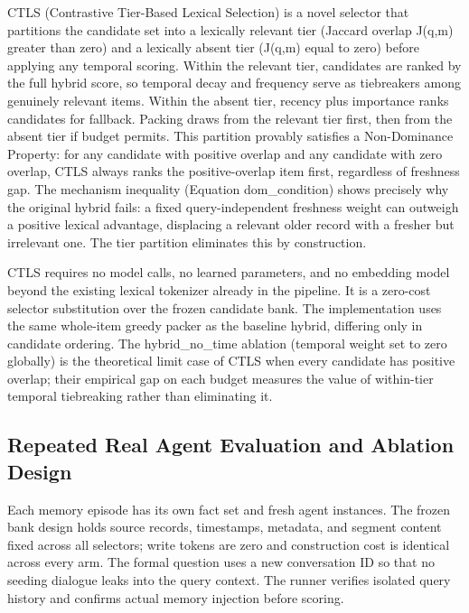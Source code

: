 \label{sec:method_ctls}

CTLS (Contrastive Tier-Based Lexical Selection) is a novel selector that partitions the candidate set into a lexically relevant tier (Jaccard overlap J(q,m) greater than zero) and a lexically absent tier (J(q,m) equal to zero) before applying any temporal scoring. Within the relevant tier, candidates are ranked by the full hybrid score, so temporal decay and frequency serve as tiebreakers among genuinely relevant items. Within the absent tier, recency plus importance ranks candidates for fallback. Packing draws from the relevant tier first, then from the absent tier if budget permits. This partition provably satisfies a Non-Dominance Property: for any candidate with positive overlap and any candidate with zero overlap, CTLS always ranks the positive-overlap item first, regardless of freshness gap. The mechanism inequality (Equation dom\_condition) shows precisely why the original hybrid fails: a fixed query-independent freshness weight can outweigh a positive lexical advantage, displacing a relevant older record with a fresher but irrelevant one. The tier partition eliminates this by construction. \citep{ref_959d6858d034c6e1}

CTLS requires no model calls, no learned parameters, and no embedding model beyond the existing lexical tokenizer already in the pipeline. It is a zero-cost selector substitution over the frozen candidate bank. The implementation uses the same whole-item greedy packer as the baseline hybrid, differing only in candidate ordering. The hybrid\_no\_time ablation (temporal weight set to zero globally) is the theoretical limit case of CTLS when every candidate has positive overlap; their empirical gap on each budget measures the value of within-tier temporal tiebreaking rather than eliminating it. \citep{ref_ab2c226739f2f52a}

\subsection{Repeated Real Agent Evaluation and Ablation Design}

\label{sec:method_protocol}

Each memory episode has its own fact set and fresh agent instances. The frozen bank design holds source records, timestamps, metadata, and segment content fixed across all selectors; write tokens are zero and construction cost is identical across every arm. The formal question uses a new conversation ID so that no seeding dialogue leaks into the query context. The runner verifies isolated query history and confirms actual memory injection before scoring. \citep{ref_ab2c226739f2f52a}

